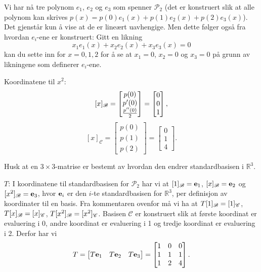 \begin{losning}
\begin{punkt}
\noindent
Vi har nå tre polynom $e_1$, $e_2$ og $e_3$ som spenner $\mathcal{P}_2$ (det er konstruert slik at alle polynom kan skrives $p(x)=p(0)e_1(x)+p(1)e_2(x)+p(2)e_3(x)$). Det gjenstår kun å vise at de er lineært uavhengige. Men dette følger også fra hvordan $e_i$-ene er konstruert: Gitt en likning $$x_1e_1(x)+x_2e_2(x)+x_3e_3(x)=0$$ kan du sette inn for $x=0,1,2$ for å se at $x_1=0$, $x_2=0$ og $x_3=0$ på grunn av likningene som definerer $e_i$-ene.
\end{punkt}

\begin{punkt}
Koordinatene til $x^2$: $$[x]_{\mathscr{B}}=\begin{bmatrix}
p(0)\\
p'(0)\\
\frac{p''(0)}{2}
\end{bmatrix}=\begin{bmatrix}
0\\
0\\
1
\end{bmatrix},$$ $$[x]_{\mathscr{C}}=\begin{bmatrix}
p(0)\\
p(1)\\
p(2)
\end{bmatrix}=\begin{bmatrix}
0\\
1\\
4
\end{bmatrix}.$$
\end{punkt}

\begin{punkt} 
Husk at en $3\times 3$-matrise er bestemt av hvordan den endrer standardbasisen i $\mathbb{R}^3$.  


\noindent
$T$: I koordinatene til standardbasisen for $\mathcal{P}_2$ har vi at $[1]_{\mathscr{B}}=\mathbf{e}_1$, $[x]_{\mathscr{B}}=\mathbf{e}_2$ og~$[x^2]_{\mathscr{B}}=\mathbf{e}_3$, hvor $\mathbf{e}_i$ er den $i$-te standardbasisen for $\mathbb{R}^3$, per definisjon av koordinater til en basis. Fra kommentaren ovenfor må vi ha at $T[1]_{\mathscr{B}}=[1]_\mathscr{C}$, $T[x]_{\mathscr{B}}=[x]_\mathscr{C}$, $T[x^2]_{\mathscr{B}}=[x^2]_\mathscr{C}$. Basisen $\mathscr{C}$ er konstruert slik at første koordinat er evaluering i 0, andre koordinat er evaluering i 1 og tredje koordinat er evaluering i 2. Derfor har vi
$$
T=
\begin{bmatrix}
T\mathbf{e}_1 & T\mathbf{e}_2 & T\mathbf{e}_3
\end{bmatrix} =
\begin{bmatrix}
1 & 0 & 0\\
1 & 1 & 1\\
1 & 2 & 4
\end{bmatrix}.
$$


\end{punkt}
\end{losning}
